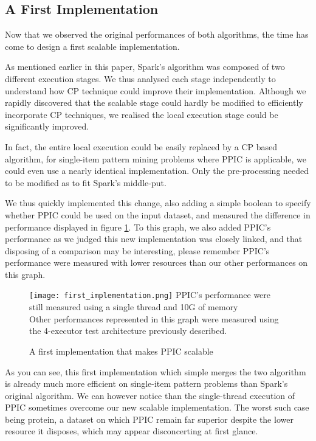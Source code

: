 \documentclass{eplmastersthesis}
\newcommand\danger{%
 \makebox[1.4em][c]{%
 \makebox[0pt][c]{\raisebox{.1em}{\small!}}%
 \makebox[0pt][c]{\color{red}\Large$\bigtriangleup$}}}%
\begin{document}
\subsection{A First Implementation}

Now that we observed the original performances of both algorithms, the time has come to design a first scalable implementation. \newline

As mentioned earlier in this paper, Spark's algorithm was composed of two different execution stages. We thus analysed each stage independently to understand how CP technique could improve their implementation. Although we rapidly discovered that the scalable stage could hardly be modified to efficiently incorporate CP techniques, we realised the local execution stage could be significantly improved. \newline

In fact, the entire local execution could be easily replaced by a CP based algorithm, for single-item pattern mining problems where PPIC is applicable, we could even use a nearly identical implementation. Only the pre-processing needed to be modified as to fit Spark's middle-put. \newline

We thus quickly implemented this change, also adding a simple boolean to specify whether PPIC could be used on the input dataset, and measured the difference in performance displayed in figure \ref{fig:first_scalable_CPbased_implementation}. To this graph, we also added PPIC's performance as we judged this new implementation was closely linked, and that disposing of a comparison may be interesting, please remember PPIC's performance were measured with lower resources than our other performances on this graph.  \newline

\begin{figure}[h]
  \centering
  \texttt{[image: first\_implementation.png]}
  \danger PPIC's performance were still measured using a single thread and 10G of memory \danger \\
  Other performances represented in this graph were measured using the 4-executor test architecture previously described.
  \caption{A first implementation that makes PPIC scalable}
  \label{fig:first_scalable_CPbased_implementation}
\end{figure}

As you can see, this first implementation which simple merges the two algorithm is already much more efficient on single-item pattern problems than Spark's original algorithm. We can however notice than the single-thread execution of PPIC sometimes overcome our new scalable implementation. The worst such case being protein, a dataset on which PPIC remain far superior despite the lower resource it disposes, which may appear disconcerting at first glance. \newline
\end{document}
